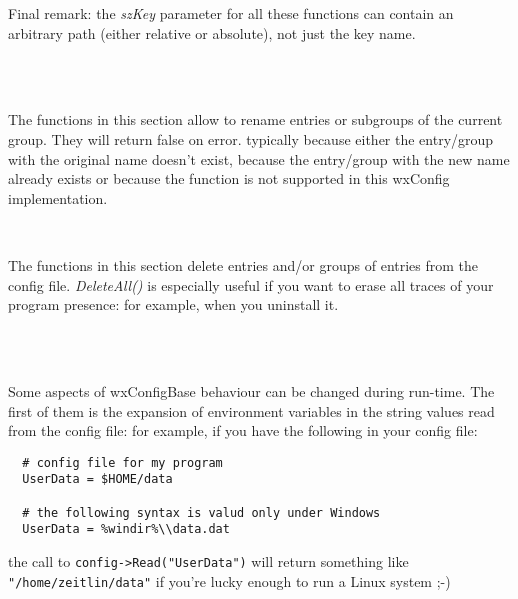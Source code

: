 Final remark: the {\it szKey} parameter for all these functions can contain an
arbitrary path (either relative or absolute), not just the key name.

\\
\\


\label{configrenaming}

The functions in this section allow to rename entries or subgroups of the
current group. They will return false on error. typically because either the
entry/group with the original name doesn't exist, because the entry/group with
the new name already exists or because the function is not supported in this
wxConfig implementation.

\\


\label{configdeleting}

The functions in this section delete entries and/or groups of entries from the
config file. {\it DeleteAll()} is especially useful if you want to erase all
traces of your program presence: for example, when you uninstall it.

\\
\\


\label{configoptions}

Some aspects of wxConfigBase behaviour can be changed during run-time. The
first of them is the expansion of environment variables in the string values
read from the config file: for example, if you have the following in your
config file:

\begin{verbatim}
  # config file for my program
  UserData = $HOME/data

  # the following syntax is valud only under Windows
  UserData = %windir%\\data.dat
\end{verbatim}
the call to {\tt config->Read("UserData")} will return something like
{\tt "/home/zeitlin/data"} if you're lucky enough to run a Linux system ;-)

